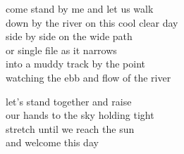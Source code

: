 
\begin{poem}
come stand by me and let us walk \\
down by the river on this cool clear day \\
side by side on the wide path \\
or single file as it narrows \\
into a muddy track by the point \\
watching the ebb and flow of the river

let's stand together and raise  \\
our hands to the sky holding tight \\
stretch until we reach the sun \\
and welcome this day
\end{poem}

